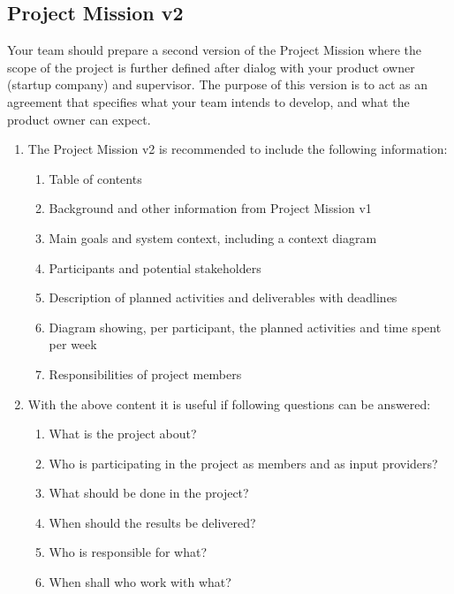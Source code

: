 \documentclass[10pt,a4paper]{article}
\begin{document}
\subsection{Project Mission v2}
Your team should prepare a second version of the Project Mission where the scope of the project is further defined after dialog with your product owner (startup company) and supervisor. The purpose of this version is to act as an agreement that specifies what your team intends to develop, and what the product owner can expect.

 \begin{enumerate}
  \item The Project Mission v2 is recommended to include the following information:
  \begin{enumerate}
    \item Table of contents
    \item Background and other information from Project Mission v1
    \item Main goals and system context, including a context diagram
    \item Participants and potential stakeholders
    \item Description of planned activities and deliverables with deadlines
    \item Diagram showing, per participant, the planned activities and time spent per week
    \item Responsibilities of project members
  \end{enumerate}
  \item With the above content it is useful if following questions can be answered:
  \begin{enumerate}
   \item What is the project about?
   \item Who is participating in the project as members and as input providers?
   \item What should be done in the project?
   \item When should the results be delivered?
   \item Who is responsible for what?
   \item When shall who work with what?
 \end{enumerate}
\end{enumerate}

\end{document}
